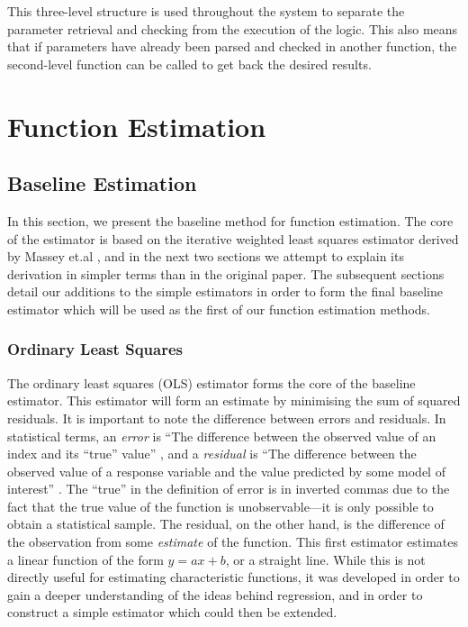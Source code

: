 \documentclass[a4paper,11pt]{article}
\begin{document}
   This three-level structure is used throughout the system to separate the
   parameter retrieval and checking from the execution of the logic. This also
   means that if parameters have already been parsed and checked in another
   function, the second-level function can be called to get back the desired
   results.
\section{Function Estimation}
\label{sec-6}
\subsection{Baseline Estimation}
\label{sec-6-1}

In this section, we present the baseline method for function estimation. The
core of the estimator is based on the iterative weighted least squares estimator
derived by Massey et.al \cite{massey1996estimating}, and in the next two
sections we attempt to explain its derivation in simpler terms than in the
original paper. The subsequent sections detail our additions to the simple
estimators in order to form the final baseline estimator which will be used as
the first of our function estimation methods.
\subsubsection{Ordinary Least Squares}
\label{sec-6-1-1}

The ordinary least squares (OLS) estimator forms the core of the baseline
estimator. This estimator will form an estimate by minimising the sum of squared
residuals. It is important to note the difference between errors and
residuals. In statistical terms, an \emph{error} is ``The difference between the
observed value of an index and its ``true'' value'' \cite{2008oecd}, and a
\emph{residual} is ``The difference between the observed value of a response
variable and the value predicted by some model of interest''
\cite{everitt2010cambridge}. The ``true'' in the definition of error is in
inverted commas due to the fact that the true value of the function is
unobservable---it is only possible to obtain a statistical sample. The residual,
on the other hand, is the difference of the observation from some
\emph{estimate} of the function. This first estimator estimates a linear
function of the form $y=ax+b$, or a straight line. While this is not directly
useful for estimating characteristic functions, it was developed in order to
gain a deeper understanding of the ideas behind regression, and in order to
construct a simple estimator which could then be extended.
\end{document}

